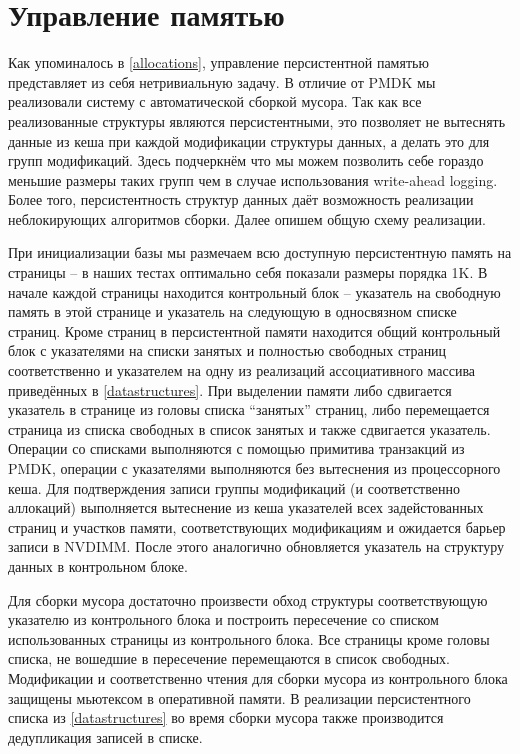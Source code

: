\documentclass[pdftex,ptm,12pt,a4paper]{report}
\theoremstyle{definition}
\begin{document}
\section{Управление памятью}
Как упоминалось в \ref{allocations}, управление персистентной памятью представляет из себя нетривиальную задачу.
В отличие от PMDK мы реализовали систему с автоматической сборкой мусора. Так как все реализованные структуры являются персистентными, это позволяет не вытеснять данные из кеша
при каждой модификации структуры данных, а делать это для групп модификаций. Здесь подчеркнём что мы можем позволить себе гораздо меньшие размеры
таких групп чем в случае использования write-ahead logging. Более того, персистентность структур данных даёт возможность реализации неблокирующих алгоритмов сборки.
Далее опишем общую схему реализации.

При инициализации базы мы размечаем всю доступную персистентную память на страницы -- в наших тестах оптимально себя показали размеры порядка 1K.
В начале каждой страницы находится контрольный блок -- указатель на свободную память в этой странице и указатель на следующую в односвязном списке страниц.
Кроме страниц в персистентной памяти находится общий контрольный блок с указателями на списки занятых и полностью свободных страниц соответственно и
указателем на одну из реализаций ассоциативного массива приведённых в \ref{datastructures}. При выделении памяти либо сдвигается указатель в странице из головы списка ``занятых''
страниц, либо перемещается страница из списка свободных в список занятых и также сдвигается указатель. Операции со списками выполняются с помощью примитива транзакций из PMDK, операции
с указателями выполняются без вытеснения из процессорного кеша. Для подтверждения записи группы модификаций (и соответственно аллокаций) выполняется вытеснение из кеша указателей
всех задейстованных страниц и участков памяти, соответствующих модификациям и ожидается барьер записи в NVDIMM. После этого аналогично обновляется указатель на структуру данных в
контрольном блоке.

Для сборки мусора достаточно произвести обход структуры соответствующую указателю из контрольного блока и построить пересечение со списком использованных страницы из контрольного блока.
Все страницы кроме головы списка, не вошедшие в пересечение перемещаются в список свободных. Модификации и соответственно чтения для сборки мусора из контрольного блока защищены
мьютексом в оперативной памяти. В реализации персистентного списка из \ref{datastructures} во время сборки мусора также производится дедупликация записей в списке.
\end{document}
